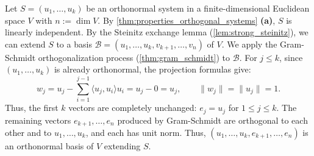 \begin{exercisesolution}
\label{sol:extend_orthonormal_system_sheet23}
Let $S = (u_1, \dots, u_k)$ be an orthonormal system in a finite-di\-men\-sional Euclidean space $V$ with $n := \dim V$.
By \cref{thm:properties_orthogonal_systems} \textbf{(a)}, $S$ is linearly independent.
By the Steinitz exchange lemma (\cref{lem:strong_steinitz}), we can extend $S$ to a basis $\mathcal{B} = (u_1, \dots, u_k, v_{k+1}, \dots, v_n)$ of $V$.
We apply the Gram-Schmidt orthogonalization process (\cref{thm:gram_schmidt}) to $\mathcal{B}$.
For $j \le k$, since $(u_1, \dots, u_k)$ is already orthonormal, the projection formulas give:
\[
w_j = u_j - \sum_{i=1}^{j-1} \langle u_j, u_i \rangle u_i = u_j - 0 = u_j, \qquad \|w_j\| = \|u_j\| = 1.
\]
Thus, the first $k$ vectors are completely unchanged: $e_j = u_j$ for $1 \le j \le k$.
The remaining vectors $e_{k+1}, \dots, e_n$ produced by Gram-Schmidt are orthogonal to each other and to $u_1, \dots, u_k$, and each has unit norm.
Thus, $(u_1, \dots, u_k, e_{k+1}, \dots, e_n)$ is an orthonormal basis of $V$ extending $S$.
\end{exercisesolution}

